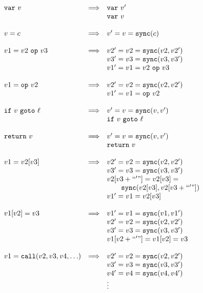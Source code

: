 \documentclass{sig-alternate}
\newcommand \dsl [1] {\ensuremath{{\tt #1}}\xspace}
\newcommand \Sync{\dsl{sync}}
\begin{document}
\begin{figure}
{\scriptsize\[
\begin{array}{lrl}
   \dsl{var}\ v& \Longrightarrow & \dsl{var}\ v'\\
                     & & \dsl{var}\ v\\
& & \\
    v = c & \Longrightarrow & v ' = v = \Sync(c)\\
& & \\
    v1 = v2\ \dsl{op}\ v3 & \Longrightarrow & v2' = v2 = \Sync(v2, v2')\\
& & v3' = v3 = \Sync(v3, v3')\\
& & v1' = v1 = v2\ \dsl{op}\ v3\\
& & \\
    v1 = \dsl{op}\ v2 & \Longrightarrow & v2' = v2 = \Sync(v2, v2')\\
& & v1' = v1 = \dsl{op}\ v2\\
& & \\
    \dsl{if}\ v \ \dsl{goto}\ \ell & \Longrightarrow & v' = v =
    \Sync(v, v')\\
    & & \dsl{if}\ v \ \dsl{goto}\ \ell \\
& & \\
    \dsl{return}\ v & \Longrightarrow & v' = v = \Sync(v, v')\\
    & & \dsl{return}\ v \\
& & \\
    v1 = v2[v3] & \Longrightarrow & v2' = v2 =\Sync(v2, v2')\\
& & v3' = v3 = \Sync(v3, v3')\\
& & v2[v3+``'"] = v2[v3] = \\
& & \qquad\Sync(v2[v3], v2[v3+``'"])\\
& & v1' = v1 = v2[v3]\\
& & \\
    v1[v2] = v3 & \Longrightarrow & v1' = v1 = \Sync(v1, v1')\\
& & v2' = v2 = \Sync(v2, v2')\\
& & v3' = v3 = \Sync(v3, v3')\\
& & v1[v2+``'"] = v1[v2] = v3\\
& & \\
    v1 = \dsl{call}(v2, v3, v4, \ldots) & \Longrightarrow & v2' = v2 =
    \Sync(v2, v2')\\
& & v3' = v3 = \Sync(v3, v3')\\
& & v4' = v4 = \Sync(v4, v4')\\
& & \vdots \\

\end{array}\]}
\end{figure}
\end{document}
